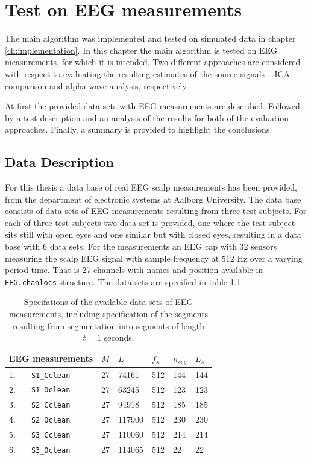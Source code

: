 \chapter{Test on EEG measurements}\label{ch:eeg_test}
The main algorithm was implemented and tested on simulated data in chapter \ref{ch:implementation}. 
In this chapter the main algorithm is tested on EEG measurements, for which it is intended. 
Two different approaches are considered with respect to evaluating the resulting estimates of the source signals -- ICA comparison and alpha wave analysis, respectively.

At first the provided data sets with EEG measurements are described. Followed by a test description and an analysis of the results for both of the evaluation approaches. 
Finally, a summary is provided to highlight the conclusions.  

\section{Data Description}
For this thesis a data base of real EEG scalp measurements has been provided, from the department of electronic systems at Aalborg University. 
The data base consists of data sets of EEG measurements resulting from three test subjects. 
For each of three test subjects two data set is provided, one where the test subject sits still with open eyes and one similar but with closed eyes, resulting in a data base with 6 data sets. 
For the measurements an EEG cap with $32$ sensors measuring the scalp EEG signal with sample frequency at $512$ Hz over a varying period time.
That is 27 channels with names and position available in \texttt{EEG.chanlocs} structure.
The data sets are specified in table \ref{tab:data_spec} 
\begin{table}[]
\centering
\begin{tabular}{|l|l|l|l|l|l|l|}
\hline
 \multicolumn{2}{|l|}{EEG measurements } & $M$ & $L$    & $f_s$ & $n_{seg}$ & $L_s$ \\ \hline
1.& \texttt{S1\_Cclean} & 27  & 74161  & 512   & 144       & 144   \\ \hline
2.& \texttt{S1\_Oclean} & 27  & 63245  & 512   & 123       & 123   \\ \hline
3.& \texttt{S2\_Cclean} & 27  & 94918  & 512   & 185       & 185   \\ \hline
4.& \texttt{S2\_Oclean} & 27  & 117900 & 512   & 230       & 230   \\ \hline
5.& \texttt{S3\_Cclean} & 27  & 110060 & 512   & 214       & 214   \\ \hline
6.& \texttt{S3\_Oclean} & 27  & 114065 & 512   & 22        & 22    \\ \hline
\end{tabular}
\caption{Specifations of the available data sets of EEG measurements, including specification of the segments resulting from segmentation into segments of length $t=1$ seconds.}
\label{tab:data_spec}
\end{table}

